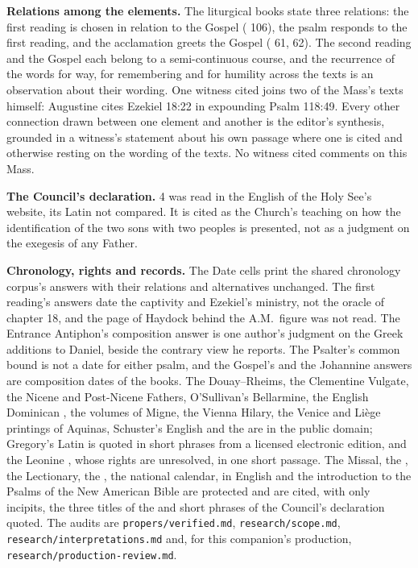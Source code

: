 {\textbf{Relations among the elements.} The liturgical books state three
relations: the first reading is chosen in relation to the Gospel
( 106), the psalm responds to the first reading, and the
acclamation greets the Gospel (
61, 62). The second reading and the Gospel each belong to a semi-continuous
course, and the recurrence of the words for way, for remembering and for
humility across the texts is an observation about their wording. One witness
cited joins two of the Mass's texts himself: Augustine cites Ezekiel 18:22 in
expounding Psalm 118:49. Every other connection drawn between one element and
another is the editor's synthesis, grounded in a witness's statement about his
own passage where one is cited and otherwise resting on the wording of the
texts. No witness cited comments on this Mass.

\textbf{The Council's declaration.}  4 was read in the
English of the Holy See's website, its Latin not compared. It is cited as the
Church's teaching on how the identification of the two sons with two peoples
is presented, not as a judgment on the exegesis of any Father.

\textbf{Chronology, rights and records.} The Date cells print the shared
chronology corpus's answers with their relations and alternatives unchanged.
The first reading's answers date the captivity and Ezekiel's ministry, not the
oracle of chapter 18, and the page of Haydock behind the A.M.\ figure was not
read. The Entrance Antiphon's composition answer is one author's judgment on
the Greek additions to Daniel, beside the contrary view he reports. The
Psalter's common bound is not a date for either psalm, and the Gospel's and
the Johannine answers are composition dates of the books. The Douay--Rheims,
the Clementine Vulgate, the Nicene and Post-Nicene Fathers, O'Sullivan's
Bellarmine, the English Dominican , the volumes of Migne, the
Vienna Hilary, the Venice and Li\`ege printings of Aquinas, Schuster's English
and the  are in the public domain; Gregory's Latin
is quoted in short phrases from a licensed electronic edition, and the Leonine
, whose rights are unresolved, in one short passage. The Missal,
the , the Lectionary, the , the national
calendar,  in English and the introduction to the Psalms of
the New American Bible are protected and are cited, with only incipits, the
three titles of the  and short phrases of the Council's declaration
quoted. The audits are \texttt{propers/verified.md}, \texttt{research/scope.md},
\texttt{research/interpretations.md} and, for this companion's production,
\texttt{research/production-review.md}.
\par}


